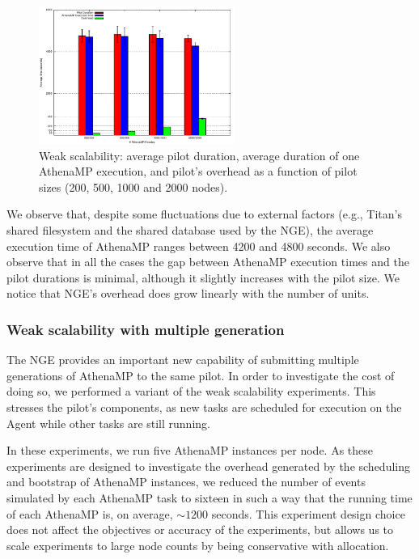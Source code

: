 \begin{figure}[!htb]
        \includegraphics[height=4.5cm,width=\columnwidth]{./figures/NGE/weak1.pdf}
    \caption{Weak scalability: average pilot duration, average duration of one AthenaMP execution, and pilot's overhead as a function of pilot sizes (200, 500, 1000 and 2000 nodes).}
\label{fig:weakScal1a}
\end{figure}

We observe that, despite some fluctuations due to external factors (e.g.,
Titan's shared filesystem and the shared database used by the NGE), the average
execution time of AthenaMP  ranges between 4200 and 4800 seconds.  We  also
observe that in all the cases the gap between AthenaMP execution times and the
pilot durations is minimal, although it slightly increases with the pilot size.
We  notice that NGE's overhead does grow linearly with the number of units.

\subsubsection{Weak scalability with multiple generation }

The NGE provides an important new capability of submitting multiple generations
of AthenaMP to the same pilot. In order to investigate the cost of doing so, we
performed a variant of the weak scalability experiments. This stresses the
pilot's components, as new tasks are scheduled for execution on the Agent while
other tasks are still running.

In these experiments, we run five AthenaMP instances per node.  As these
experiments are designed to investigate the overhead generated by the scheduling
and bootstrap of AthenaMP instances, we reduced the number of events simulated
by each AthenaMP task to sixteen in such a way that the running time of each
AthenaMP is, on average, $\sim 1200$ seconds. This experiment design choice does
not affect the  objectives or accuracy of the experiments, but allows us to
scale experiments to large node counts by being conservative with allocation.

